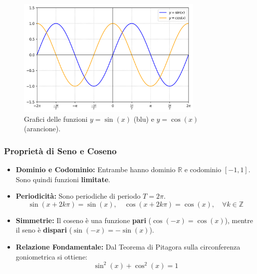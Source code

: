 \documentclass[oneside,10pt]{book} %
\begin{document}
\begin{figure}[H]
    \centering
    \includegraphics[width=0.8\textwidth]{./img/seno_coseno_grafici.png}
    \caption{Grafici delle funzioni \(y=\sin(x)\) (blu) e \(y=\cos(x)\) (arancione).}
    \label{fig:seno_coseno_grafici}
\end{figure}
\FloatBarrier

\subsubsection{Proprietà di Seno e Coseno}
\begin{itemize}
    \item \textbf{Dominio e Codominio:} Entrambe hanno dominio \(\mathbb{R}\) e codominio \([-1, 1]\). Sono quindi funzioni \textbf{limitate}.
    \item \textbf{Periodicità:} Sono periodiche di periodo \(T = 2\pi\).
    \[ \sin(x + 2k\pi) = \sin(x), \quad \cos(x + 2k\pi) = \cos(x), \quad \forall k \in \mathbb{Z} \]
    \item \textbf{Simmetrie:} Il coseno è una funzione \textbf{pari} (\(\cos(-x) = \cos(x)\)), mentre il seno è \textbf{dispari} (\(\sin(-x) = -\sin(x)\)).
    \item \textbf{Relazione Fondamentale:} Dal Teorema di Pitagora sulla circonferenza goniometrica si ottiene:
    \[ \sin^2(x) + \cos^2(x) = 1 \]
  \end{itemize}
\end{document}
